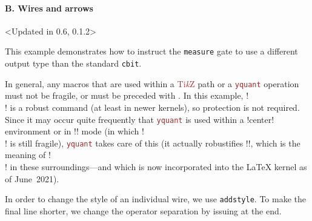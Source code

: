 \documentclass{scrartcl}
\makeatletter
\newenvironment{codeexample*}{%
   \VerbatimEnvironment%
   \let\FVB@VerbatimOut\minted@FVB@VerbatimOut
   \let\FVE@VerbatimOut\minted@FVE@VerbatimOut
   \minted@configlang{tex}%
   \minted@fvset
   \begin{VerbatimOut}[codes={\catcode`\^^I=12},firstline,lastline]{\minted@jobname.pyg}%
}{
   \end{VerbatimOut}%
   \minted@langlinenoson%
   \begin{adjustbox}{center}
       \minted@jobname.pyg %
   \end{adjustbox}\nopagebreak
   \expandafter\minted@pygmentize\expandafter{\minted@lang}%
   \minted@langlinenosoff%
   \par%
}
\def\TikZ{\textcolor{brown}{Ti\textit kZ}}
\def\pkg#1{\textcolor{brown}{\texttt{#1}}}
\def\ttlink{\link\texttt}
\def\texlink{\link\tex}
\def\Yquant{\pkg{yquant}}
\makeatother
\begin{document}
            \paragraph{B. Wires and arrows}\leavevmode
               \begin{example}<Updated in 0.6, 0.1.2>
                  \begin{codeexample*}
                  \end{codeexample*}
                  This example demonstrates how to instruct the \ttlink{measure} gate to use a different output type than the standard \ttlink{cbit}.

                  In general, any macros that are used within a \TikZ{} path or a \Yquant{} operation must not be fragile, or must be preceded with \texlink\protect.
                  In this example, \tex!\\! is a robust command (at least in newer kernels), so protection is not required.
                  Since it may occur quite frequently that \Yquant{} is used within a \tex!center! environment or in \tex!\centering! mode (in which \tex!\\! is still fragile), \Yquant{} takes care of this (it actually robustifies \tex!\@centercr!, which is the meaning of \tex!\\! in these surroundings---and which is now incorporated into the \LaTeX{} kernel as of June~2021).

                  In order to change the style of an individual wire, we use \ttlink{addstyle}.
                  To make the final line shorter, we change the operator separation by issuing \texlink{\yquantset} at the end.
               \end{example}
\end{document}
